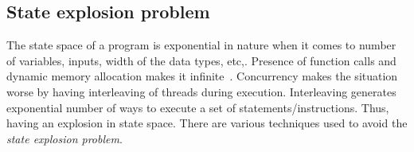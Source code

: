 %
%

\subsection{State explosion problem \label{state_exp_prob}}

The state space of a program is exponential in nature when it comes to number of variables, inputs, width of the data types, etc,. 
Presence of function calls and dynamic memory allocation makes it infinite~\citep{d2008survey}. 
Concurrency makes the situation worse by having interleaving of threads during execution. 
Interleaving generates exponential number of ways to execute a set of statements/instructions. 
Thus, having an explosion in state space. 
There are various techniques used to avoid the \emph{state explosion problem}. 
 
